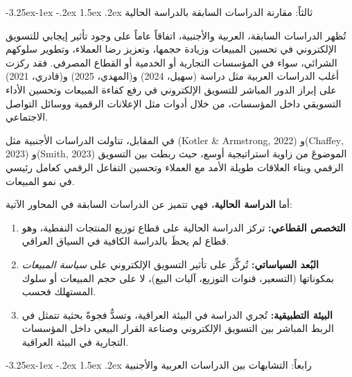 \documentclass[12pt, a4paper]{report}
\makeatletter
\newcommand{\lr}[1]{\textenglish{#1}}
\renewcommand\subsection{\@startsection{subsection}{2}{\z@}%
  {-3.25ex\@plus -1ex \@minus -.2ex}%
  {1.5ex \@plus .2ex}%
  {\normalfont\large\bfseries\color{sectiongray}}}
\makeatother
\begin{document}
\subsection{ثالثاً: مقارنة الدراسات السابقة بالدراسة الحالية}

تُظهر الدراسات السابقة، العربية والأجنبية، اتفاقاً عاماً على وجود تأثير إيجابي للتسويق الإلكتروني في تحسين المبيعات وزيادة حجمها، وتعزيز رضا العملاء، وتطوير سلوكهم الشرائي، سواء في المؤسسات التجارية أو الخدمية أو القطاع المصرفي. فقد ركزت أغلب الدراسات العربية مثل دراسة (سهيل، 2024) و(المهدي، 2025) و(قادري، 2021) على إبراز الدور المباشر للتسويق الإلكتروني في رفع كفاءة المبيعات وتحسين الأداء التسويقي داخل المؤسسات، من خلال أدوات مثل الإعلانات الرقمية ووسائل التواصل الاجتماعي.

في المقابل، تناولت الدراسات الأجنبية مثل (\lr{Kotler \& Armstrong}, 2022) و(\lr{Chaffey}, 2023) و(\lr{Smith}, 2023) الموضوعَ من زاوية استراتيجية أوسع، حيث ربطت بين التسويق الرقمي وبناء العلاقات طويلة الأمد مع العملاء وتحسين التفاعل الرقمي كعامل رئيسي في نمو المبيعات.

أما \textbf{الدراسة الحالية}، فهي تتميز عن الدراسات السابقة في المحاور الآتية:

\begin{enumerate}[label=\arabic*.]
  \item \textbf{التخصص القطاعي:} تركز الدراسة الحالية على قطاع توزيع المنتجات النفطية، وهو قطاع لم يحظَ بالدراسة الكافية في السياق العراقي.
  \item \textbf{البُعد السياساتي:} تُركِّز على تأثير التسويق الإلكتروني على \textit{سياسة المبيعات} بمكوناتها (التسعير، قنوات التوزيع، آليات البيع)، لا على حجم المبيعات أو سلوك المستهلك فحسب.
  \item \textbf{البيئة التطبيقية:} تُجري الدراسة في البيئة العراقية، وتسدُّ فجوةً بحثية تتمثل في الربط المباشر بين التسويق الإلكتروني وصناعة القرار البيعي داخل المؤسسات التجارية في البيئة العراقية.
\end{enumerate}


\subsection{رابعاً: التشابهات بين الدراسات العربية والأجنبية}
\end{document}
